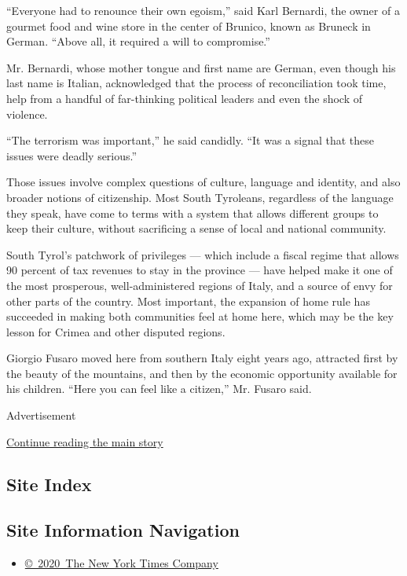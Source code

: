 ``Everyone had to renounce their own egoism,'' said Karl Bernardi, the
owner of a gourmet food and wine store in the center of Brunico, known
as Bruneck in German. ``Above all, it required a will to compromise.''

Mr. Bernardi, whose mother tongue and first name are German, even though
his last name is Italian, acknowledged that the process of
reconciliation took time, help from a handful of far-thinking political
leaders and even the shock of violence.

``The terrorism was important,'' he said candidly. ``It was a signal
that these issues were deadly serious.''

Those issues involve complex questions of culture, language and
identity, and also broader notions of citizenship. Most South Tyroleans,
regardless of the language they speak, have come to terms with a system
that allows different groups to keep their culture, without sacrificing
a sense of local and national community.

South Tyrol's patchwork of privileges --- which include a fiscal regime
that allows 90 percent of tax revenues to stay in the province --- have
helped make it one of the most prosperous, well-administered regions of
Italy, and a source of envy for other parts of the country. Most
important, the expansion of home rule has succeeded in making both
communities feel at home here, which may be the key lesson for Crimea
and other disputed regions.

Giorgio Fusaro moved here from southern Italy eight years ago, attracted
first by the beauty of the mountains, and then by the economic
opportunity available for his children. ``Here you can feel like a
citizen,'' Mr. Fusaro said.

Advertisement

\protect\hyperlink{after-bottom}{Continue reading the main story}

\hypertarget{site-index}{%
\subsection{Site Index}\label{site-index}}

\hypertarget{site-information-navigation}{%
\subsection{Site Information
Navigation}\label{site-information-navigation}}

\begin{itemize}
\tightlist
\item
  \href{https://help.nytimes3xbfgragh.onion/hc/en-us/articles/115014792127-Copyright-notice}{©~2020~The
  New York Times Company}
\end{itemize}

